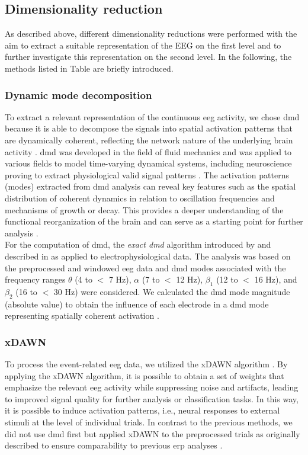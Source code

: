 \newpage
\subsection{Dimensionality reduction}
As described above, different dimensionality reductions were performed with the aim to extract a suitable representation of the EEG on the first level and to further investigate this representation on the second level. In the following, the methods listed in Table \label{tab:ml_methods} are briefly introduced. 

\subsubsection{Dynamic mode decomposition}
To extract a relevant representation of the continuous \gls{eeg} activity, we chose \gls{dmd} because it is able to decompose the signals into spatial activation patterns that are dynamically coherent, reflecting the network nature of the underlying brain activity \cite{Brunton2016}. \Gls{dmd} was developed in the field of fluid mechanics and was applied to various fields to model time-varying dynamical systems, including neuroscience proving to extract physiological valid signal patterns \cite{Brunton2016, Kunert-Graf2019, Schmid2010, Schmid2008}. The activation patterns (modes) extracted from \gls{dmd} analysis can reveal key features such as the spatial distribution of coherent dynamics in relation to oscillation frequencies and mechanisms of growth or decay. This provides a deeper understanding of the functional reorganization of the brain and can serve as a starting point for further analysis \cite{Brunton2016}.\\
For the computation of \gls{dmd}, the \textit{exact \gls{dmd}} algorithm introduced by \citeauthor{Tu2014} \cite{Tu2014} and described in \cite{Brunton2016} as applied to electrophysiological data. The analysis was based on the preprocessed and windowed \gls{eeg} data and \gls{dmd} modes associated with the frequency ranges $\theta$ (4 to $<$ 7 Hz), $\alpha$ (7 to $<$ 12 Hz), $\beta_1$ (12 to $<$ 16 Hz), and $\beta_2$ (16 to $<$ 30 Hz) were considered. We calculated the \gls{dmd} mode magnitude (absolute value) to obtain the influence of each electrode in a \gls{dmd} mode representing spatially coherent activation \cite{Brunton2016}.

\subsubsection{xDAWN}
To process the event-related \gls{eeg} data, we utilized the xDAWN algorithm \cite{rivet2009xdawn}. By applying the xDAWN algorithm, it is possible to obtain a set of weights that emphasize the relevant \gls{eeg} activity while suppressing noise and artifacts, leading to improved signal quality for further analysis or classification tasks. In this way, it is possible to induce activation patterns, i.e., neural responses to external stimuli at the level of individual trials. In contrast to the previous methods, we did not use \gls{dmd} first but applied xDAWN to the preprocessed trials as originally described to ensure comparability to previous \gls{erp} analyses \cite{Reuter2019}.

